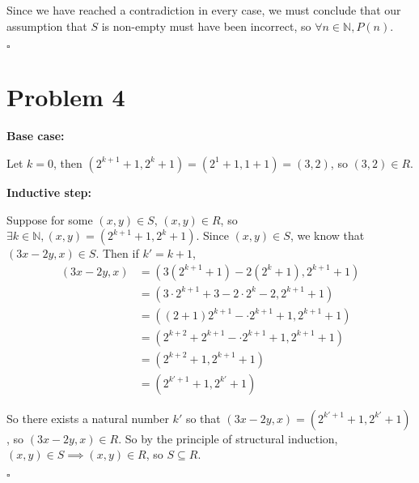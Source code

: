 \documentclass[12pt]{article}
\newcommand{\N}{\mathbb{N}}
\begin{document}
Since we have reached a contradiction in every case, we must conclude that our assumption that $S$ is non-empty must have been incorrect, so $\forall n \in \N, P(n)$.

\hfill $\square$

\newpage
\section*{Problem 4}


\noindent \textbf{Base case:}

Let $k = 0$, then $(2^{k+1} + 1, 2^k + 1) = (2^1 + 1, 1 + 1) = (3, 2)$, so $(3, 2) \in R$.

\noindent \textbf{Inductive step:}

Suppose for some $(x, y) \in S$, $(x, y) \in R$, so $\exists k \in \N, (x, y) = (2^{k+1} + 1, 2^k + 1)$. Since  $(x, y) \in S$, we know that $(3x - 2y, x) \in S$. Then if $k' = k + 1$,
\begin{align*}
    (3x - 2y, x) &= (3(2^{k+1} + 1) - 2(2^k + 1), 2^{k+1} + 1) \\
    &= (3 \cdot 2^{k+1} + 3 - 2 \cdot 2^k - 2, 2^{k+1} + 1) \\
    &= ((2 + 1) 2^{k+1} - \cdot 2^{k+1} + 1, 2^{k+1} + 1) \\
    &= (2^{k+2} + 2^{k+1} - \cdot 2^{k+1} + 1, 2^{k+1} + 1) \\
    &= (2^{k+2} + 1, 2^{k+1} + 1) \\
    &= (2^{k'+1} + 1, 2^{k'} + 1)
\end{align*}

\noindent So there exists a natural number $k'$ so that $(3x - 2y, x) = (2^{k'+1} + 1, 2^{k'} + 1)$, so $(3x - 2y, x) \in R$. So by the principle of structural induction, $(x, y) \in S \implies (x, y) \in R$, so $S \subseteq R$.

\hfill $\square$
\end{document}
